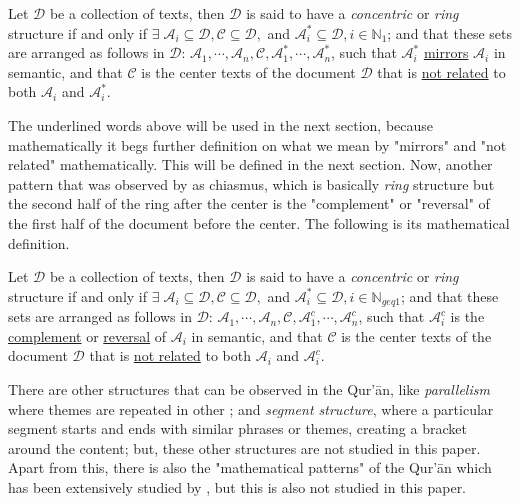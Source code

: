 \begin{defn}[\it Concentric]\label{defn:concentric}
    Let $\mathscr{D}$ be a collection of texts, then $\mathscr{D}$ is said to have a \textit{concentric} or \textit{ring} structure if and only if $\exists\;\mathscr{A}_i\subseteq\mathscr{D},\mathscr{C}\subseteq\mathscr{D},$ and $\mathscr{A}_i^{*}\subseteq\mathscr{D},i\in\mathbb{N}_1$; and that these sets are arranged as follows in $\mathscr{D}$:  $\mathscr{A}_1,\cdots,\mathscr{A}_n,\mathscr{C},\mathscr{A}_1^{*},\cdots,\mathscr{A}_n^{*}$, such that $\mathscr{A}_i^{*}$ \underline{mirrors} $\mathscr{A}_i$ in semantic, and that $\mathscr{C}$ is the center texts of the document $\mathscr{D}$ that is \underline{not related} to both $\mathscr{A}_i$ and $\mathscr{A}_i^{*}$.
\end{defn}

The underlined words above will be used in the next section, because mathematically it begs further definition on what we mean by "mirrors" and "not related" mathematically. This will be defined in the next section. Now, another pattern that was observed by  as chiasmus, which is basically \textit{ring} structure but the second half of the ring after the center is the "complement" or "reversal" of the first half of the document before the center. The following is its mathematical definition.

\begin{defn}[\it Chiasmus]\label{defn:chiasmus}
    Let $\mathscr{D}$ be a collection of texts, then $\mathscr{D}$ is said to have a \textit{concentric} or \textit{ring} structure if and only if $\exists\;\mathscr{A}_i\subseteq\mathscr{D},\mathscr{C}\subseteq\mathscr{D},$ and $\mathscr{A}_i^{*}\subseteq\mathscr{D},i\in\mathbb{N}_{geq 1}$; and that these sets are arranged as follows in $\mathscr{D}$:  $\mathscr{A}_1,\cdots,\mathscr{A}_n,\mathscr{C},\mathscr{A}_1^{c},\cdots,\mathscr{A}_n^{c}$, such that $\mathscr{A}_i^{c}$ is the \underline{complement} or \underline{reversal} of $\mathscr{A}_i$ in semantic, and that $\mathscr{C}$ is the center texts of the document $\mathscr{D}$ that is \underline{not related} to both $\mathscr{A}_i$ and $\mathscr{A}_i^{c}$.
\end{defn}
There are other structures that can be observed in the Qur'\=an, like \textit{parallelism} where themes are repeated in other  ; and \textit{segment structure}, where a particular segment starts and ends with similar phrases or themes, creating a bracket around the content; but, these other structures are not studied in this paper. Apart from this, there is also the "mathematical patterns" of the Qur'\=an which has been extensively studied by , but this is also not studied in this paper.
